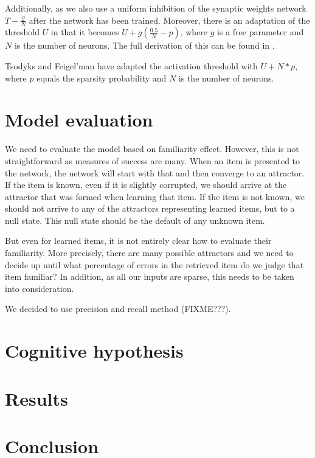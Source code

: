 \documentclass{article}
\begin{document}
Additionally, as \cite{amit1987information} we also use a uniform inhibition of the synaptic weights network $T-\frac{g}{N}$ after the network has been trained. Moreover, there is an adaptation of the threshold $U$ in that it becomes $U+g(\frac{0.5}{N}-p)$, where $g$ is a free parameter and $N$ is the number of neurons. The full derivation of this can be found in \cite{amit1987information}.

Tsodyks and Feigel'man \cite{tsodyks1988enhanced} have adapted the activation threshold with $U+N*p$, where $p$ equals the sparsity probability and $N$ is the number of neurons.

\section{Model evaluation}

We need to evaluate the model based on familiarity effect. However, this is not straightforward as measures of success are many. When an item is presented to the network, the network will start with that and then converge to an attractor. If the item is known, even if it is slightly corrupted, we should arrive at the attractor that was formed when learning that item. If the item is not known, we should not arrive to any of the attractors representing learned items, but to a null state. This null state should be the default of any unknown item.

But even for learned items, it is not entirely clear how to evaluate their familiarity. More precisely, there are many possible attractors and we need to decide up until what percentage of errors in the retrieved item do we judge that item familiar? In addition, as all our inputs are sparse, this needs to be taken into consideration.

We decided to use precision and recall method (FIXME???).

\section{Cognitive hypothesis}

\section{Results}

\section{Conclusion}
\end{document}
